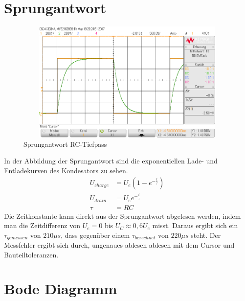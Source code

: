 \section{Sprungantwort}
\begin{figure}[H]
 \begin{center}
  \includegraphics[height=6cm,width=12cm]{Oszi_Bilder/RC_Sprung}
 \end{center}
 \caption{Sprungantwort RC-Tiefpass}
\end{figure}
\noindent
In der Abbildung der Sprungantwort sind die exponentiellen Lade- und Entladekurven des Kondesators zu sehen. \\
\begin{align*}
 U_{charge} &= U_e(1 - e^{-\frac{t}{\tau}})\\
 U_{drain} &= U_e e^{-\frac{t}{\tau}}\\
 \tau &= RC
\end{align*}
\noindent
Die Zeitkonstante kann direkt aus der Sprungantwort abgelesen werden, indem man die Zeitdifferenz von $U_e=0$ bis $U_C \approx 0,6U_e$ misst. Daraus ergibt
sich ein $\tau_{gemessen}$ von $210\mu s$, dass gegenüber einem $\tau_{berechnet}$ von $220\mu s$ steht. Der Messfehler ergibt sich durch, ungenaues ablesen
ablesen mit dem Cursor und Bauteiltoleranzen.\\

\section{Bode Diagramm}

